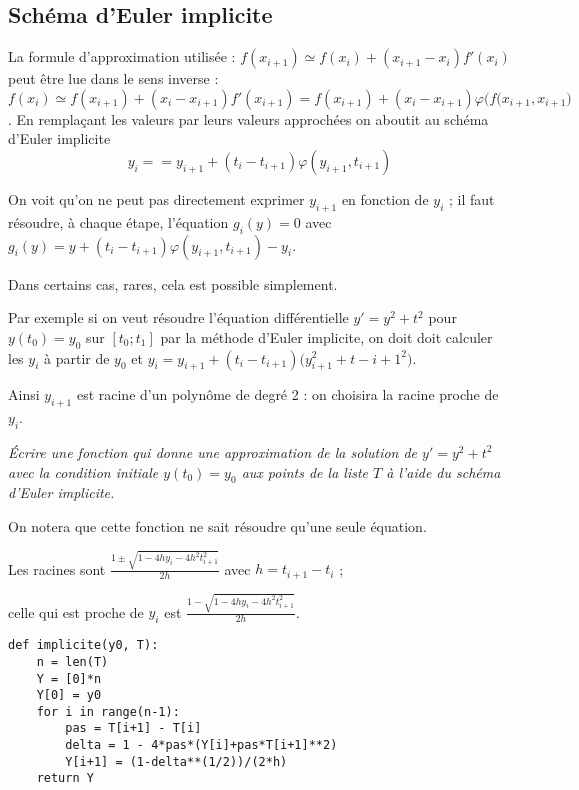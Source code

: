 \subsection{Schéma d'Euler implicite}
La formule d'approximation utilisée : $f(x_{i+1}) \simeq f(x_i) + (x_{i+1} - x_i) f'(x_i)$ peut être lue dans le sens inverse : 
$f(x_i) \simeq f(x_{i+1}) + (x_i - x_{i+1}) f'(x_{i+1}) = f(x_{i+1}) + (x_i - x_{i+1})\varphi\bigl(f(x_{i+1}, x_{i+1}\bigr)$. En remplaçant les valeurs par leurs valeurs approchées on aboutit au schéma d'Euler implicite
\[y_{i} =  = y_{i+1}+ (t_i -t_{i+1}) \varphi(y_{i+1},t_{i+1})\]

On voit qu'on ne peut pas directement exprimer $y_{i+1}$ en fonction de $y_i$ ;  il faut résoudre, à chaque étape, l'équation $g_i(y)=0$ avec $g_i(y)= y + (t_i -t_{i+1}) \varphi(y_{i+1},t_{i+1}) - y_i$.

\medskip

Dans certains cas, rares, cela est possible simplement.

Par exemple si on veut résoudre l'équation différentielle $y'=y^2+t^2$ pour $y(t_0)=y_0$ sur $[t_0;t_1]$ par la méthode d'Euler implicite, on doit doit calculer les $y_i$ à partir de $y_0$ et $y_i = y_{i+1}  + (t_i - t_{i+1}) \bigl(y_{i+1}^2+t-{i+1}^2\bigr)$.

Ainsi $y_{i+1}$ est racine d'un polynôme de degré 2 : on choisira la racine proche de $y_i$.
\begin{Exercise}[label={exo:RK}]\it
Écrire une fonction  qui donne une approximation de la solution de $y' = y^2 + t^2$ avec la condition initiale $y(t_0)=y_0$ aux points de la liste $T$ à l'aide du schéma d'Euler implicite.

On notera que cette fonction ne sait résoudre qu'une seule équation.
\end{Exercise}
\begin{Answer}
Les racines sont $\displaystyle \frac{1\pm\sqrt{1-4hy_i-4h^2t_{i+1}^2}}{2h}$ avec $ h = t_{i+1} - t_i$ ;

celle qui est proche de $y_i$  est
$\displaystyle \frac{1-\sqrt{1-4hy_i-4h^2t_{i+1}^2}}{2h}$.

\smallskip


\begin{lstlisting}
def implicite(y0, T):
    n = len(T)
    Y = [0]*n 
    Y[0] = y0
    for i in range(n-1): 
        pas = T[i+1] - T[i]
        delta = 1 - 4*pas*(Y[i]+pas*T[i+1]**2)
        Y[i+1] = (1-delta**(1/2))/(2*h)
    return Y
\end{lstlisting}
\end{Answer}

